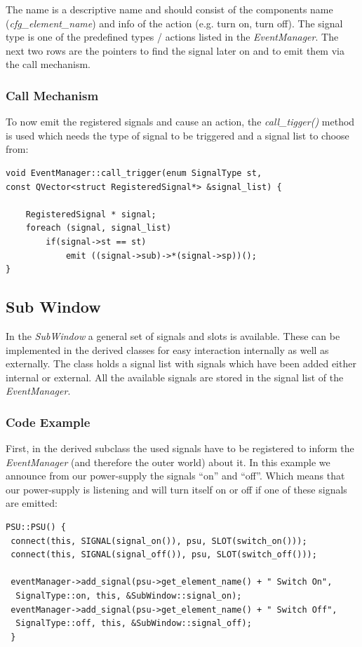 \documentclass[10pt,a4paper]{article}
\begin{document}
			The name is a descriptive name and should consist of the components name (\textit{cfg\_element\_name}) and info of the action (e.g. turn on, turn off). The signal type is one of the predefined types / actions listed in the \textit{EventManager}. The next two rows are the pointers to find the signal later on and to emit them via the call mechanism.

		\subsubsection{Call Mechanism}
		
		To now emit the registered signals and cause an action, the \textit{call\_tigger()} method is used which needs the type of signal to be triggered and a signal list to choose from:
		
\begin{lstlisting}
void EventManager::call_trigger(enum SignalType st,
const QVector<struct RegisteredSignal*> &signal_list) {

    RegisteredSignal * signal;
    foreach (signal, signal_list)
        if(signal->st == st)
            emit ((signal->sub)->*(signal->sp))();
}
\end{lstlisting}

	\subsection{Sub Window}
	
	In the \textit{SubWindow} a general set of signals and slots is available. These can be implemented in the derived classes for easy interaction internally as well as externally. The class holds a signal list with signals which have been added either internal or external. All the available signals are stored in the signal list of the \textit{EventManager}.

		\subsubsection{Code Example}

		First, in the derived subclass the used signals have to be registered to inform the \textit{EventManager} (and therefore the outer world) about it. In this example we announce from our power-supply the signals \enquote{on} and \enquote{off}. Which means that our power-supply is listening and will turn itself on or off if one of these signals are emitted:
		
\begin{lstlisting}
PSU::PSU() {
 connect(this, SIGNAL(signal_on()), psu, SLOT(switch_on()));
 connect(this, SIGNAL(signal_off()), psu, SLOT(switch_off()));

 eventManager->add_signal(psu->get_element_name() + " Switch On",
  SignalType::on, this, &SubWindow::signal_on);
 eventManager->add_signal(psu->get_element_name() + " Switch Off",
  SignalType::off, this, &SubWindow::signal_off);
 }
\end{lstlisting}
\end{document}
